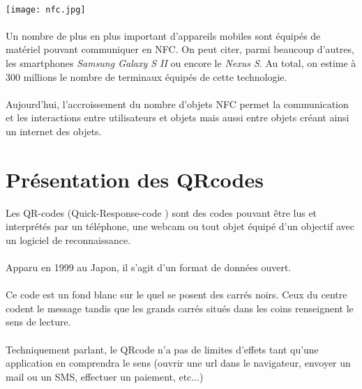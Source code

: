 \documentclass[a4paper,12pt,titlepage]{report}
\begin{document}
\newpage

\paragraph*{}
\texttt{[image: nfc.jpg]}


\paragraph*{}
Un nombre de plus en plus important d'appareils mobiles sont équipés de matériel pouvant communiquer en NFC. On peut citer, parmi beaucoup d'autres, les smartphones \emph{Samsung Galaxy S II} ou encore le \emph{Nexus S}. Au total, on estime à 300 millions le nombre de terminaux équipés de cette technologie.
\paragraph*{}
Aujourd'hui, l'accroissement du nombre d'objets NFC permet la communication et les interactions entre utilisateurs et objets mais aussi entre objets créant ainsi un internet des objets.




\newpage

\section{Présentation des QRcodes}

Les QR-codes (\og Quick-Response-code \fg{} ) sont des codes pouvant être lus et interprétés par un téléphone, une webcam ou tout objet équipé d'un objectif avec un logiciel de reconnaissance.
\paragraph*{}
Apparu en 1999 au Japon, il s'agit d'un format de données ouvert.
\paragraph*{}
Ce code est un fond blanc sur le quel se posent des carrés noirs. Ceux du centre codent le message tandis que les grands carrés situés dans les coins renseignent le sens de lecture.
\paragraph*{}
Techniquement parlant, le QRcode n'a pas de limites d'effets tant qu'une application en comprendra le sens (ouvrir une url dans le navigateur, envoyer un mail ou un SMS, effectuer un paiement, etc...)
\end{document}

